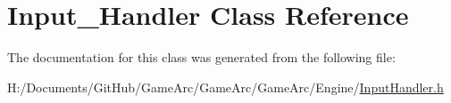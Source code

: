 \hypertarget{class_input___handler}{\section{Input\+\_\+\+Handler Class Reference}
\label{class_input___handler}
}


The documentation for this class was generated from the following file\+:\begin{DoxyCompactItemize}
\item 
H\+:/\+Documents/\+Git\+Hub/\+Game\+Arc/\+Game\+Arc/\+Game\+Arc/\+Engine/\hyperlink{_input_handler_8h}{Input\+Handler.\+h}\end{DoxyCompactItemize}
